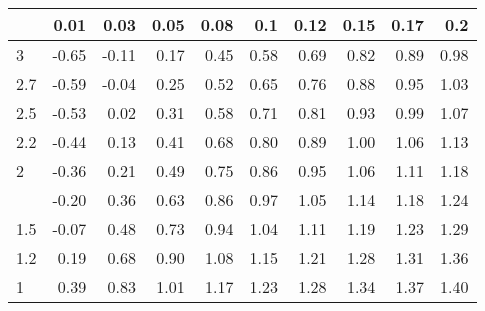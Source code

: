 
\begin{tabular}{lrrrrrrrrr}
\toprule
  & 0.01 & 0.03 & 0.05 & 0.08 & 0.1 & 0.12 & 0.15 & 0.17 & 0.2\\
\midrule
3 & -0.65 & -0.11 & 0.17 & 0.45 & 0.58 & 0.69 & 0.82 & 0.89 & 0.98\\
2.7 & -0.59 & -0.04 & 0.25 & 0.52 & 0.65 & 0.76 & 0.88 & 0.95 & 1.03\\
2.5 & -0.53 & 0.02 & 0.31 & 0.58 & 0.71 & 0.81 & 0.93 & 0.99 & 1.07\\
2.2 & -0.44 & 0.13 & 0.41 & 0.68 & 0.80 & 0.89 & 1.00 & 1.06 & 1.13\\
2 & -0.36 & 0.21 & 0.49 & 0.75 & 0.86 & 0.95 & 1.06 & 1.11 & 1.18\\
\addlinespace
1.7 & -0.20 & 0.36 & 0.63 & 0.86 & 0.97 & 1.05 & 1.14 & 1.18 & 1.24\\
1.5 & -0.07 & 0.48 & 0.73 & 0.94 & 1.04 & 1.11 & 1.19 & 1.23 & 1.29\\
1.2 & 0.19 & 0.68 & 0.90 & 1.08 & 1.15 & 1.21 & 1.28 & 1.31 & 1.36\\
1 & 0.39 & 0.83 & 1.01 & 1.17 & 1.23 & 1.28 & 1.34 & 1.37 & 1.40\\
\bottomrule
\end{tabular}
